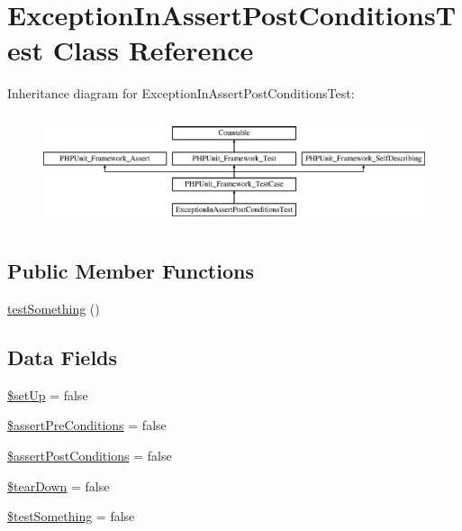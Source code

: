 \hypertarget{class_exception_in_assert_post_conditions_test}{}\section{Exception\+In\+Assert\+Post\+Conditions\+Test Class Reference}
\label{class_exception_in_assert_post_conditions_test}
Inheritance diagram for Exception\+In\+Assert\+Post\+Conditions\+Test\+:\begin{figure}[H]
\begin{center}
\leavevmode
\includegraphics[height=3.289281cm]{class_exception_in_assert_post_conditions_test}
\end{center}
\end{figure}
\subsection*{Public Member Functions}
\begin{DoxyCompactItemize}
\item 
\mbox{\hyperlink{class_exception_in_assert_post_conditions_test_a0fc4e17369bc9607ebdd850d9eda8167}{test\+Something}} ()
\end{DoxyCompactItemize}
\subsection*{Data Fields}
\begin{DoxyCompactItemize}
\item 
\mbox{\hyperlink{class_exception_in_assert_post_conditions_test_aed7dec37f7cfd2a33216b3f81ebaeb8e}{\$set\+Up}} = false
\item 
\mbox{\hyperlink{class_exception_in_assert_post_conditions_test_af1c82be5eeeef75035a066c7cc2eb172}{\$assert\+Pre\+Conditions}} = false
\item 
\mbox{\hyperlink{class_exception_in_assert_post_conditions_test_ae16868ae0cb9f100fb80bf4987de5a85}{\$assert\+Post\+Conditions}} = false
\item 
\mbox{\hyperlink{class_exception_in_assert_post_conditions_test_a9639b8e6f680299142ffe313f876712f}{\$tear\+Down}} = false
\item 
\mbox{\hyperlink{class_exception_in_assert_post_conditions_test_a25acbdb5bf8dc30b31f537d60bfb02f5}{\$test\+Something}} = false
\end{DoxyCompactItemize}
